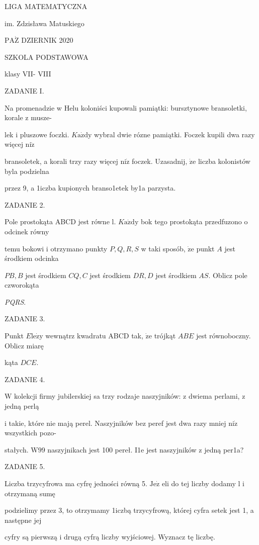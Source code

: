 \documentclass[a4paper,12pt]{article}
\begin{document}
LIGA MATEMATYCZNA

im. Zdzisława Matuskiego

$\mathrm{P}\mathrm{A}\dot{\mathrm{Z}}$ DZIERNIK 2020

SZKOLA PODSTAWOWA

klasy VII- VIII

ZADANIE I.

Na promenadzie w Helu koloniści kupowali pamiątki: bursztynowe bransoletki, korale z musze-

lek i pluszowe foczki. $K\mathrm{a}\dot{\mathrm{z}}\mathrm{d}\mathrm{y}$ wybral dwie rózne pamiątki. Foczek kupili dwa razy więcej $\mathrm{n}\mathrm{i}\dot{\mathrm{z}}$

bransoletek, a korali trzy razy więcej $\mathrm{n}\mathrm{i}\dot{\mathrm{z}}$ foczek. Uzasadnij, $\dot{\mathrm{z}}\mathrm{e}$ liczba kolonistów byla podzielna

przez 9, a 1iczba kupionych branso1etek by1a parzysta.

ZADANIE 2.

Pole prostokąta ABCD jest równe l. $K\mathrm{a}\dot{\mathrm{z}}\mathrm{d}\mathrm{y}$ bok tego prostokąta przedfuzono o odcinek równy

temu bokowi i otrzymano punkty $P, Q, R, S$ w taki sposób, $\dot{\mathrm{z}}\mathrm{e}$ punkt $A$ jest środkiem odcinka

$PB, B$ jest środkiem $CQ, C$ jest środkiem $DR, D$ jest środkiem $AS$. Oblicz pole czworokąta

{\it PQRS}.

ZADANIE 3.

Punkt $E\mathrm{l}\mathrm{e}\dot{\mathrm{z}}\mathrm{y}$ wewnątrz kwadratu ABCD tak, $\dot{\mathrm{z}}\mathrm{e}$ trójkąt $ABE$ jest równoboczny. Oblicz miarę

kąta $DCE.$

ZADANIE 4.

$\mathrm{W}$ kolekcji firmy jubilerskiej sa trzy rodzaje naszyjników: z dwiema perlami, z jedną perlą

i takie, które nie mają perel. Naszyjników bez peref jest dwa razy mniej $\mathrm{n}\mathrm{i}\dot{\mathrm{z}}$ wszystkich pozo-

stałych. $\mathrm{W}99$ naszyjnikach jest 100 pereł. I1e jest naszyjników z jedną per1a?

ZADANIE 5.

Liczba trzycyfrowa ma cyfrę jedności równą 5. $\mathrm{J}\mathrm{e}\dot{\mathrm{z}}$ eli do tej liczby dodamy l i otrzymaną sumę

podzielimy przez 3, to otrzymamy 1iczbą trzycyfrową, której cyfra setek jest 1, a następne jej

cyfry są pierwszą i drugą cyfrą liczby wyjściowej. Wyznacz tę liczbę.
\end{document}
